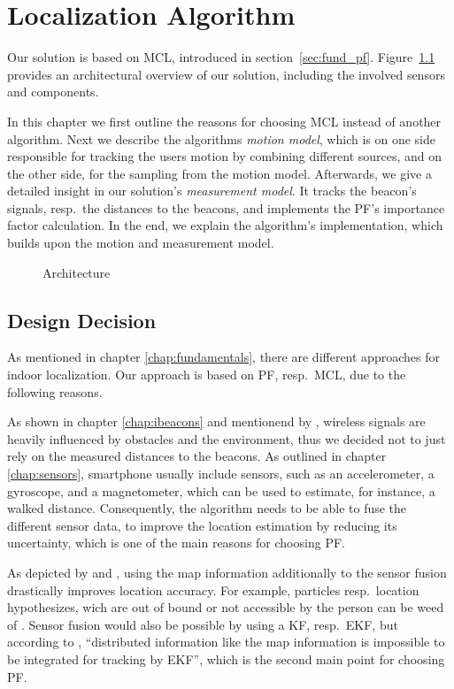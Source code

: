 \chapter{Localization Algorithm} \label{chap:pf}
Our solution is based on \acl{MCL}, introduced in section~\ref{sec:fund_pf}. Figure~\ref{fig:algo_architecture} provides an architectural overview of our solution, including the involved sensors and components.

In this chapter we first outline the reasons for choosing \acs{MCL} instead of another algorithm. Next we describe the algorithms \emph{motion model}, which is on one side responsible for tracking the users motion by combining different sources, and on the other side, for the sampling from the motion model. Afterwards, we give a detailed insight in our solution's \emph{measurement model}. It tracks the beacon's signals, resp.\ the distances to the beacons, and implements the \acs{PF}'s importance factor calculation. In the end, we explain the algorithm's implementation, which builds upon the motion and measurement model.

\begin{figure}
\def\svgwidth{0.9\textwidth}

\caption{Architecture}
\label{fig:algo_architecture}
\end{figure} %


\section{Design Decision} \label{sec:algo_decision}
As mentioned in chapter \ref{chap:fundamentals}, there are different approaches for indoor localization. Our approach is based on \acl{PF}, resp.\ \acl{MCL}, due to the following reasons.

As shown in chapter \ref{chap:ibeacons} and mentionend by \citet{IEEE:survey_wireless_indoor_pos}, wireless signals are heavily influenced by obstacles and the environment, thus we decided not to just rely on the measured distances to the beacons. As outlined in chapter \ref{chap:sensors}, smartphone usually include sensors, such as an accelerometer, a gyroscope, and a magnetometer, which can be used to estimate, for instance, a walked distance. Consequently, the algorithm needs to be able to fuse the different sensor data, to improve the location estimation by reducing its uncertainty, which is one of the main reasons for choosing \acs{PF}.

As depicted by \citet{siddiqi:experiments_mcl_wifi} and \citet{wang:wlan}, using the map information additionally to the sensor fusion drastically improves location accuracy. For example, particles resp.\ location hypothesizes, wich are out of bound or not accessible by the person can be weed of \citep{straub:pf,siddiqi:experiments_mcl_wifi}. Sensor fusion would also be possible by using a \acl{KF}, resp.\ \acs{EKF}, but according to \citet{wang:wlan}, ``distributed information like the map information is impossible to be integrated for tracking by \acs{EKF}'', which is the second main point for choosing \acs{PF}.

